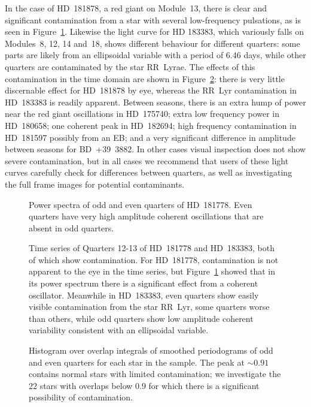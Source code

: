 \documentclass[modern]{aastex62}
\begin{document}
In the case of HD~181878, a red giant on Module~13, there is clear and significant contamination from a star with several low-frequency pulsations, as is seen in Figure~\ref{contamination}. Likewise the light curve for HD 183383, which variously falls on Modules~8, 12, 14 and~18, shows different behaviour for different quarters: some parts are likely from an ellipsoidal variable with a period of 6.46 days, while other quarters are contaminated by the star RR~Lyrae. The effects of this contamination in the time domain are shown in Figure~\ref{contamination_timeseries}: there is very little discernable effect for HD~181878 by eye, whereas the RR~Lyr contamination in HD~183383 is readily apparent. Between seasons, there is an extra hump of power near the red giant oscillations in HD~175740; extra low frequency power in HD~180658; one coherent peak in  HD~182694; high frequency contamination in HD~181597 possibly from an EB; and a very significant difference in amplitude between seasons for BD~+39~3882. In other cases visual inspection does not show severe contamination, but in all cases we recommend that users of these light curves carefully check for differences between quarters, as well as investigating the full frame images for potential contaminants.

\begin{figure}
\caption{\label{contamination}
Power spectra of odd and even quarters of HD~181778. Even quarters have very high amplitude coherent oscillations that are absent in odd quarters.}
\end{figure}

\begin{figure}
\caption{\label{contamination_timeseries}
Time series of Quarters 12-13 of HD~181778 and HD~183383, both of which show contamination. For HD~181778, contamination is not apparent to the eye in the time series, but Figure~\ref{contamination} showed that in its power spectrum there is a significant effect from a coherent oscillator. Meanwhile in HD~183383, even quarters show easily visible contamination from the star RR~Lyr, some quarters worse than others, while odd quarters show low amplitude coherent variability consistent with an ellipsoidal variable.} 
\end{figure}

\begin{figure}

\caption{\label{contamination2}
Histogram over overlap integrals of smoothed periodograms of odd and even quarters for each star in the sample. The peak at $\sim 0.91$ contains normal stars with limited contamination; we investigate the 22 stars with overlaps below 0.9 for which there is a significant possibility of contamination.}
\end{figure}
\end{document}
